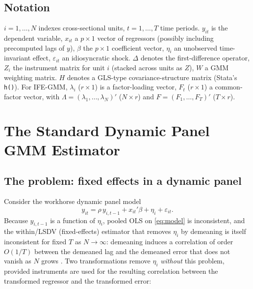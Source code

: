 \documentclass[11pt,a4paper]{article}
\newcommand{\bigO}{O}
\begin{document}
\subsection{Notation}

$i=1,\dots,N$ indexes cross-sectional units, $t=1,\dots,T$ time periods.
$y_{it}$ is the dependent variable, $x_{it}$ a $p\times1$ vector of
regressors (possibly including precomputed lags of $y$), $\beta$ the
$p\times1$ coefficient vector, $\eta_i$ an unobserved time-invariant effect,
$\varepsilon_{it}$ an idiosyncratic shock. $\Delta$ denotes the first-difference
operator, $Z_i$ the instrument matrix for unit $i$ (stacked across units as
$Z$), $W$ a GMM weighting matrix. $H$ denotes a GLS-type covariance-structure
matrix (Stata's \texttt{h()}). For IFE-GMM, $\lambda_i$ ($r\times1$) is a
factor-loading vector, $F_t$ ($r\times1$) a common-factor vector, with
$\Lambda=(\lambda_1,\dots,\lambda_N)'$ ($N\times r$) and
$F=(F_1,\dots,F_T)'$ ($T\times r$).

\section{The Standard Dynamic Panel GMM Estimator}
\label{sec:gmm}

\subsection{The problem: fixed effects in a dynamic panel}

Consider the workhorse dynamic panel model
\begin{equation}
y_{it} = \rho\, y_{i,t-1} + x_{it}'\beta + \eta_i + \varepsilon_{it}. \label{eq:model}
\end{equation}
Because $y_{i,t-1}$ is a function of $\eta_i$, pooled OLS on
\eqref{eq:model} is inconsistent, and the within/LSDV (fixed-effects)
estimator that removes $\eta_i$ by demeaning is itself inconsistent for
fixed $T$ as $N\to\infty$: demeaning induces a correlation of order
$\bigO(1/T)$ between the demeaned lag and the demeaned error that does not
vanish as $N$ grows \citep{Nickell1981}. Two transformations remove $\eta_i$
\emph{without} this problem, provided instruments are used for the
resulting correlation between the transformed regressor and the transformed
error:
\end{document}
